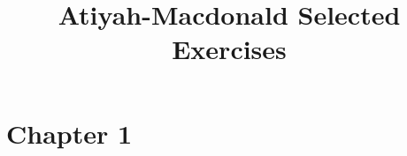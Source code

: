 \documentclass{amsart}
\title{Atiyah-Macdonald Selected Exercises}
\begin{document}
    \maketitle

    \section*{Chapter 1}
    
\end{document}

